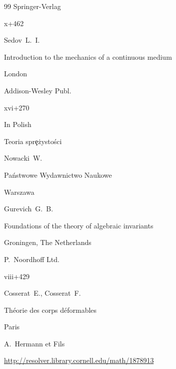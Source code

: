 \begin{thebibliography}{99}
\publ Springer-Verlag

\totalpages x+462 





\by Sedov~L.~I.

\book Introduction to the mechanics of a continuous medium


\publaddr London

\publaddr Addison-Wesley Publ. 

\totalpages xvi+270 





\lang In Polish

\book Teoria spr\c{e}\.{z}ysto\'sci

\by Nowacki~W. 

\publaddr Pa\'nstwowe Wydawnictwo Naukowe

\publ Warszawa












\by Gurevich~G.~B.

\book Foundations of the theory of algebraic invariants


\publaddr Groningen, The Netherlands

\publ P.~Noordhoff Ltd.


\totalpages viii+429 




\by Cosserat~E., Cosserat~F.

\book Th\'eorie des corps d\'eformables

\publaddr Paris

\publ A.~Hermann et Fils


\elink \url{http://resolver.library.cornell.edu/math/1878913}





\end{thebibliography}
